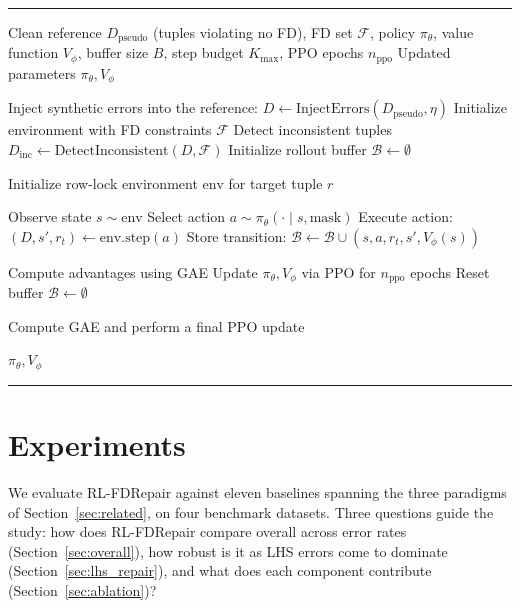 \documentclass[sigconf]{acmart}
\begin{document}
\begin{algorithm}[t]
\caption{PPO Epoch}
\label{alg:ppo_epoch}
\hrule
\vspace{2pt}
\begin{algorithmic}[1]
\Require Clean reference $D_{\text{pseudo}}$ (tuples violating no FD), FD set $\mathcal{F}$, policy $\pi_\theta$, value function $V_\phi$, buffer size $B$, step budget $K_{\max}$, PPO epochs $n_{\text{ppo}}$
\Ensure Updated parameters $\pi_\theta, V_\phi$

\State Inject synthetic errors into the reference: $D \gets \text{InjectErrors}(D_{\text{pseudo}}, \eta)$
\State Initialize environment with FD constraints $\mathcal{F}$
\State Detect inconsistent tuples $D_{\text{inc}} \gets \text{DetectInconsistent}(D, \mathcal{F})$
\State Initialize rollout buffer $\mathcal{B} \gets \emptyset$


    \State Initialize row-lock environment $\text{env}$ for target tuple $r$


        \State Observe state $s \sim \text{env}$
        \State Select action $a \sim \pi_\theta(\cdot \mid s, \text{mask})$
        \State Execute action: $(D, s', r_t) \gets \text{env.step}(a)$
        \State Store transition: $\mathcal{B} \gets \mathcal{B} \cup (s, a, r_t, s', V_\phi(s))$

    \EndWhile

        \State Compute advantages using GAE
        \State Update $\pi_\theta, V_\phi$ via PPO for $n_{\text{ppo}}$ epochs
        \State Reset buffer $\mathcal{B} \gets \emptyset$
    \EndIf

\EndFor

    \State Compute GAE and perform a final PPO update
\EndIf

\State \Return $\pi_\theta, V_\phi$
\end{algorithmic}
\vspace{2pt}
\hrule
\end{algorithm}

\section{Experiments}
\label{sec:experiments}

We evaluate RL-FDRepair against eleven baselines spanning the three paradigms of Section~\ref{sec:related}, on four benchmark datasets. Three questions guide the study: how does RL-FDRepair compare overall across error rates (Section~\ref{sec:overall}), how robust is it as LHS errors come to dominate (Section~\ref{sec:lhs_repair}), and what does each component contribute (Section~\ref{sec:ablation})?
\end{document}
